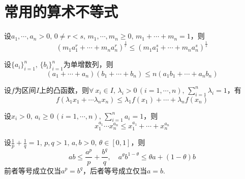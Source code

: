 \documentclass[color=green,thmcnt=section,lang=cn,12pt]{elegantbook}
\numberwithin{equation}{section}%
\numberwithin{figure}{section}%
\newcommand{\any}{\forall \ }
\begin{document}
\appendix
\chapter{常用的算术不等式}
\begin{theorem}[幂平均值不等式]\label{mipingjunzhibudengshi}
    设$a_1,\cdots,a_n>0,\,0\ne r<s,\,m_1,\cdots,m_n\geq 0,\,m_1+\cdots+m_n=1$，则 
    \begin{equation*}
      \left( m_1a_1^{r}+\cdots+m_na_n^r  \right) ^\frac{1}{r}\leq  \left( m_1a_1^{s}+\cdots+m_na_n^s  \right) ^\frac{1}{s}
    \end{equation*}
\end{theorem}

\begin{theorem}[Chebyshev不等式]\label{chebyshevbudengshi}
    设$\{a_i \}_{i=1}^n,\,\{b_i \}_{i=1}^n$为单增数列，则\begin{equation*}
      (a_1+\cdots+a_n)(b_1+\cdots+b_n)\leq n(a_1b_1+\cdots +a_nb_n)
    \end{equation*}
\end{theorem}

\begin{theorem}[Jensen不等式]\label{jensenbudenshi}
    设$f$为区间$I$上的凸函数，则$\any x_i\in I,\,\lambda_i>0\,(i=1,\cdots,n),\,\sum_{i=1 }^{n}\lambda_i=1$，有
    \begin{equation*}
      f(\lambda_1x_1+\cdots \lambda_nx_n)\leq \lambda_1f(x_1)+\cdots+\lambda_nf(x_n)
    \end{equation*} 
\end{theorem}

\begin{corollary}[加权均值不等式]
   设$x_i>0,\,a_i\geq 0\,(i=1,\cdots,n),\,\sum_{i=1}^{n}a_i=1$，则\begin{equation*}
      x_1^{a_1}\cdots x_n^{a_n}\leq x_1^{a_1}+\cdots+x_n^{a_n}
   \end{equation*}
\end{corollary}

\begin{theorem}[Young不等式]\label{youngbudengshisuanshu}
     设$\frac{1}{p}+\frac{1}{q}=1,\,p,q>1,\,a,b>0,\,\theta\in [0,1]$，则\begin{equation*}
      ab\leq \frac{a^p }{p}+\frac{b^q }{q},\quad a^\theta b^{1-\theta}\leq \theta a+(1-\theta )b
     \end{equation*}
     前者等号成立仅当$a^p=b^q$，后者等号成立仅当$a=b$.
\end{theorem}
\end{document}

